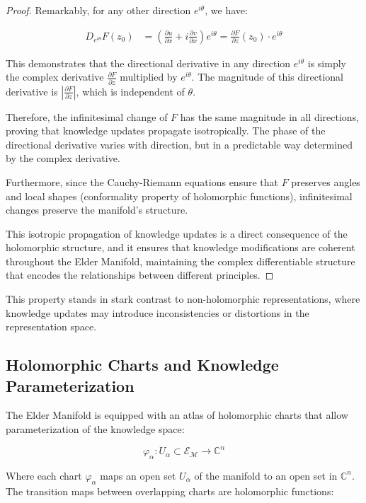 \begin{proof}
Remarkably, for any other direction $e^{i\theta}$, we have:

\begin{align}
D_{e^{i\theta}}F(z_0) &= \left(\frac{\partial u}{\partial x} + i\frac{\partial v}{\partial x}\right)e^{i\theta} = \frac{\partial F}{\partial z}(z_0) \cdot e^{i\theta}
\end{align}

This demonstrates that the directional derivative in any direction $e^{i\theta}$ is simply the complex derivative $\frac{\partial F}{\partial z}$ multiplied by $e^{i\theta}$. The magnitude of this directional derivative is $\left|\frac{\partial F}{\partial z}\right|$, which is independent of $\theta$.

Therefore, the infinitesimal change of $F$ has the same magnitude in all directions, proving that knowledge updates propagate isotropically. The phase of the directional derivative varies with direction, but in a predictable way determined by the complex derivative.

Furthermore, since the Cauchy-Riemann equations ensure that $F$ preserves angles and local shapes (conformality property of holomorphic functions), infinitesimal changes preserve the manifold's structure.

This isotropic propagation of knowledge updates is a direct consequence of the holomorphic structure, and it ensures that knowledge modifications are coherent throughout the Elder Manifold, maintaining the complex differentiable structure that encodes the relationships between different principles.
\end{proof}

This property stands in stark contrast to non-holomorphic representations, where knowledge updates may introduce inconsistencies or distortions in the representation space.

\subsection{Holomorphic Charts and Knowledge Parameterization}

The Elder Manifold is equipped with an atlas of holomorphic charts that allow parameterization of the knowledge space:

\begin{equation}
\varphi_{\alpha}: U_{\alpha} \subset \mathcal{E}_{\mathcal{M}} \rightarrow \mathbb{C}^n
\end{equation}

Where each chart $\varphi_{\alpha}$ maps an open set $U_{\alpha}$ of the manifold to an open set in $\mathbb{C}^n$. The transition maps between overlapping charts are holomorphic functions:

